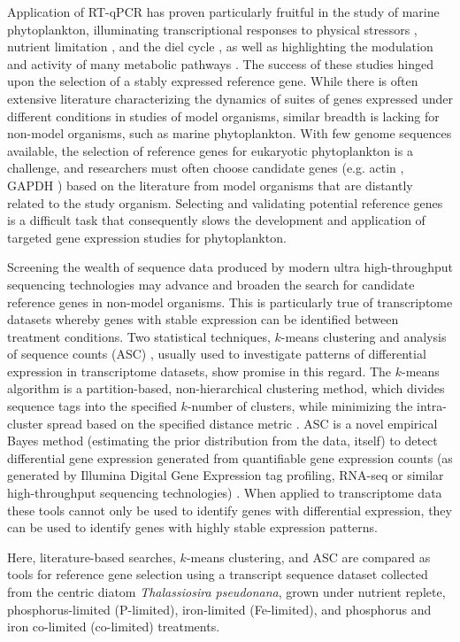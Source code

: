 	Application of RT-qPCR has proven particularly fruitful in the study of marine phytoplankton, illuminating transcriptional responses to physical stressors \citep{Rosic2010, Rosic2010}, nutrient limitation \citep{Davis2006, Moseley2006, Davis2008, Stuart2009, Whitney2011a, Wurch2011, Bender2012, Berg2008}, and the diel cycle \citep{Whitney2011a, Bender2012}, as well as highlighting the modulation and activity of many metabolic pathways \citep{Moseley2006, McGinn2008, Mock2008, Bender2012}. The success of these studies hinged upon the selection of a stably expressed reference gene. While there is often extensive literature characterizing the dynamics of suites of genes expressed under different conditions in studies of model organisms, similar breadth is lacking for non-model organisms, such as marine phytoplankton. With few genome sequences available, the selection of reference genes for eukaryotic phytoplankton is a challenge, and researchers must often choose candidate genes (e.g. actin \citep{Nicot2005}, GAPDH \citep{Czechowski2005}) based on the literature from model organisms that are distantly related to the study organism. Selecting and validating potential reference genes is a difficult task that consequently slows the development and application of targeted gene expression studies for phytoplankton. \par
	Screening the wealth of sequence data produced by modern ultra high-throughput sequencing technologies may advance and broaden the search for candidate reference genes in non-model organisms. This is particularly true of transcriptome datasets whereby genes with stable expression can be identified between treatment conditions. Two statistical techniques, $k$-means clustering \citep{Hartigan1979} and analysis of sequence counts (ASC) \citep{Wu2010}, usually used to investigate patterns of differential expression in transcriptome datasets, show promise in this regard. The $k$-means algorithm is a partition-based, non-hierarchical clustering method, which divides sequence tags into the specified $k$-number of clusters, while minimizing the intra-cluster spread based on the specified distance metric \citep{Hartigan1979, Tavazoie1999, Gerstein2000, Quackenbush2001, Dhaeseleer2005}. ASC is a novel empirical Bayes method (estimating the prior distribution from the data, itself) to detect differential gene expression generated from quantifiable gene expression counts (as generated by Illumina Digital Gene Expression tag profiling, RNA-seq or similar high-throughput sequencing technologies) \citep{Wu2010}. When applied to transcriptome data these tools cannot only be used to identify genes with differential expression, they can be used to identify genes with highly stable expression patterns.\par 
	Here, literature-based searches, $k$-means clustering, and ASC are compared as tools for reference gene selection using a transcript sequence dataset collected from the centric diatom \textit{Thalassiosira pseudonana}, grown under nutrient replete, phosphorus-limited (P-limited), iron-limited (Fe-limited), and phosphorus and iron co-limited (co-limited) treatments.

